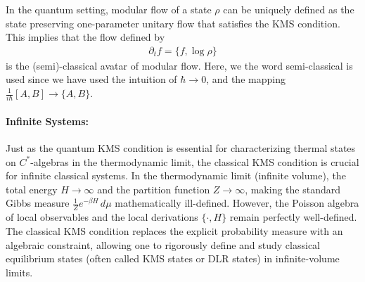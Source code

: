 \documentclass[a4paper,11pt]{article}
\theoremstyle{definition}
\newcommand{\mL}{\mathcal{L}}
\newcommand{\mM}{\mathcal{M}}
\begin{document}
In the quantum setting, modular flow of a state $\rho$ can be uniquely defined as the state preserving one-parameter unitary flow that satisfies the KMS condition. This implies that the flow defined by 
\begin{align}
    \partial_t f=\{f,\log\rho\}
\end{align}
is the (semi)-classical avatar of modular flow. Here, we the word semi-classical is used since we have used the intuition of $\hbar\to 0$, and the mapping $\frac{1}{i\hbar}[A,B]\to \{A,B\}$.

\paragraph{Infinite Systems:} Just as the quantum KMS condition is essential for characterizing thermal states on $C^*$-algebras in the thermodynamic limit, the classical KMS condition is crucial for infinite classical systems. In the thermodynamic limit (infinite volume), the total energy $H \to \infty$ and the partition function $Z \to \infty$, making the standard Gibbs measure $\frac{1}{Z} e^{-\beta H} \, d\mu$ mathematically ill-defined. However, the Poisson algebra of local observables and the local derivations $\{ \cdot, H \}$ remain perfectly well-defined. The classical KMS condition replaces the explicit probability measure with an algebraic constraint, allowing one to rigorously define and study classical equilibrium states (often called KMS states or DLR states) in infinite-volume limits.




\end{document}
